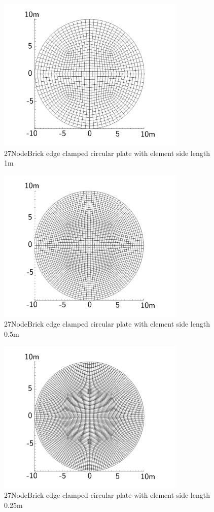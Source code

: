 \documentclass[fleqn,11pt]{article}
\begin{document}
\begin{figure}[H]
  \centering
  \includegraphics[width=9cm]{../Figure-files/circular_plate4.pdf}
  \caption{27NodeBrick edge clamped circular plate with element side length 1m }
  \label{fig 27NodeBrick edges clamped circular plate with element side length 1m }
\end{figure}


\begin{figure}[H]
  \centering
  \includegraphics[width=9cm]{../Figure-files/circular_plate5.pdf}
  \caption{27NodeBrick edge clamped circular plate with element side length 0.5m }
  \label{fig 27NodeBrick edges clamped circular plate with element side length 0.5m }
\end{figure}

\newpage

\begin{figure}[H]
  \centering
  \includegraphics[width=9cm]{../Figure-files/circular_plate6.pdf}
  \caption{27NodeBrick edge clamped circular plate with element side length 0.25m }
  \label{fig 27NodeBrick edges clamped circular plate with element side length 0.25m }
\end{figure}
\end{document}
